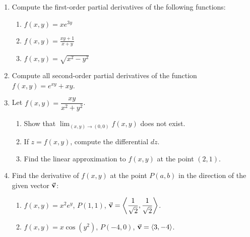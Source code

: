 \documentclass[12pt]{article}
\newcommand{\di}{\displaystyle}
\begin{document}
\begin{enumerate}
\item Compute the first-order partial derivatives of the following functions:
\begin{enumerate}
\item $\di f(x,y) = xe^{3y}$\marginpar{[2]}


\vspace{2in}

\item $\di f(x,y) = \frac{xy+1}{x+y}$\marginpar{[4]}

\vspace{2in}



\item $\di f(x,y) = \sqrt{x^2-y^2}$\marginpar{[4]}

\vspace{2in}
\end{enumerate}
\item Compute all second-order partial derivatives of the function $\di f(x,y) = e^{xy}+xy$.\marginpar{[8]}
\newpage
\item Let $f(x,y) = \dfrac{xy}{x^2+y^2}$.
\begin{enumerate}
 \item Show that $\di \lim_{(x,y)\to (0,0)}f(x,y)$ does not exist.\marginpar{[4]}

\vspace{4in}

 \item If $z=f(x,y)$, compute the differential $dz$. \marginpar{[4]}

\vspace{3in}

 \item Find the linear approximation to $f(x,y)$ at the point $(2,1)$.\marginpar{[4]}

\end{enumerate}
\newpage
\item Find the derivative of $f(x,y)$ at the point $P(a,b)$ in the direction of the given vector $\vec{\bf v}$:
\begin{enumerate}
 \item $\di f(x,y) = x^2e^y$, $P(1,1)$, $\di \vec{\bf v} = \left<\frac{1}{\sqrt{2}},\frac{1}{\sqrt{2}}\right>$.\marginpar{[5]}

\vspace{2in}
 \item $\di f(x,y) = x\cos(y^2)$, $P(-4,0)$, $\di \vec{\bf v} = \left<3,-4\right>$.\marginpar{[5]}


\end{enumerate}
\end{enumerate}
\end{document}
